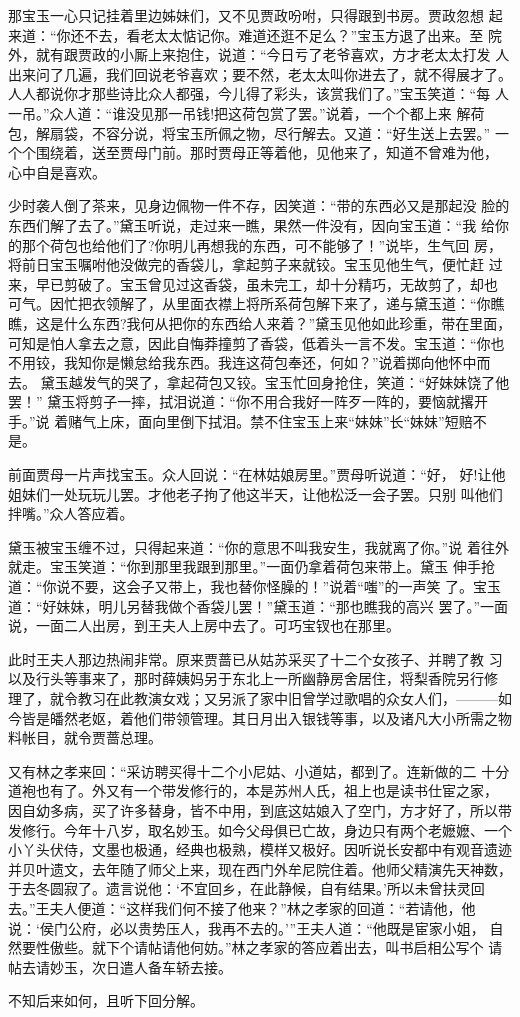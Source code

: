 那宝玉一心只记挂着里边姊妹们，又不见贾政吩咐，只得跟到书房。贾政忽想
起来道：“你还不去，看老太太惦记你。难道还逛不足么？”宝玉方退了出来。至
院外，就有跟贾政的小厮上来抱住，说道：“今日亏了老爷喜欢，方才老太太打发
人出来问了几遍，我们回说老爷喜欢；要不然，老太太叫你进去了，就不得展才了。
人人都说你才那些诗比众人都强，今儿得了彩头，该赏我们了。”宝玉笑道：“每
人一吊。”众人道：“谁没见那一吊钱!把这荷包赏了罢。”说着，一个个都上来
解荷包，解扇袋，不容分说，将宝玉所佩之物，尽行解去。又道：“好生送上去罢。”
一个个围绕着，送至贾母门前。那时贾母正等着他，见他来了，知道不曾难为他，
心中自是喜欢。

少时袭人倒了茶来，见身边佩物一件不存，因笑道：“带的东西必又是那起没
脸的东西们解了去了。”黛玉听说，走过来一瞧，果然一件没有，因向宝玉道：“我
给你的那个荷包也给他们了?你明儿再想我的东西，可不能够了！”说毕，生气回
房，将前日宝玉嘱咐他没做完的香袋儿，拿起剪子来就铰。宝玉见他生气，便忙赶
过来，早已剪破了。宝玉曾见过这香袋，虽未完工，却十分精巧，无故剪了，却也
可气。因忙把衣领解了，从里面衣襟上将所系荷包解下来了，递与黛玉道：“你瞧
瞧，这是什么东西?我何从把你的东西给人来着？”黛玉见他如此珍重，带在里面，
可知是怕人拿去之意，因此自悔莽撞剪了香袋，低着头一言不发。宝玉道：“你也
不用铰，我知你是懒怠给我东西。我连这荷包奉还，何如？”说着掷向他怀中而去。
黛玉越发气的哭了，拿起荷包又铰。宝玉忙回身抢住，笑道：“好妹妹饶了他罢！”
黛玉将剪子一摔，拭泪说道：“你不用合我好一阵歹一阵的，要恼就撂开手。”说
着赌气上床，面向里倒下拭泪。禁不住宝玉上来“妹妹”长“妹妹”短赔不是。

前面贾母一片声找宝玉。众人回说：“在林姑娘房里。”贾母听说道：“好，
好!让他姐妹们一处玩玩儿罢。才他老子拘了他这半天，让他松泛一会子罢。只别
叫他们拌嘴。”众人答应着。

黛玉被宝玉缠不过，只得起来道：“你的意思不叫我安生，我就离了你。”说
着往外就走。宝玉笑道：“你到那里我跟到那里。”一面仍拿着荷包来带上。黛玉
伸手抢道：“你说不要，这会子又带上，我也替你怪臊的！”说着“嗤”的一声笑
了。宝玉道：“好妹妹，明儿另替我做个香袋儿罢！”黛玉道：“那也瞧我的高兴
罢了。”一面说，一面二人出房，到王夫人上房中去了。可巧宝钗也在那里。

此时王夫人那边热闹非常。原来贾蔷已从姑苏采买了十二个女孩子、并聘了教
习以及行头等事来了，那时薛姨妈另于东北上一所幽静房舍居住，将梨香院另行修
理了，就令教习在此教演女戏；又另派了家中旧曾学过歌唱的众女人们，———如
今皆是皤然老妪，着他们带领管理。其日月出入银钱等事，以及诸凡大小所需之物
料帐目，就令贾蔷总理。

又有林之孝来回：“采访聘买得十二个小尼姑、小道姑，都到了。连新做的二
十分道袍也有了。外又有一个带发修行的，本是苏州人氏，祖上也是读书仕宦之家，
因自幼多病，买了许多替身，皆不中用，到底这姑娘入了空门，方才好了，所以带
发修行。今年十八岁，取名妙玉。如今父母俱已亡故，身边只有两个老嬷嬷、一个
小丫头伏侍，文墨也极通，经典也极熟，模样又极好。因听说长安都中有观音遗迹
并贝叶遗文，去年随了师父上来，现在西门外牟尼院住着。他师父精演先天神数，
于去冬圆寂了。遗言说他：‘不宜回乡，在此静候，自有结果。’所以未曾扶灵回
去。”王夫人便道：“这样我们何不接了他来？”林之孝家的回道：“若请他，他
说：‘侯门公府，必以贵势压人，我再不去的。’”王夫人道：“他既是宦家小姐，
自然要性傲些。就下个请帖请他何妨。”林之孝家的答应着出去，叫书启相公写个
请帖去请妙玉，次日遣人备车轿去接。

不知后来如何，且听下回分解。